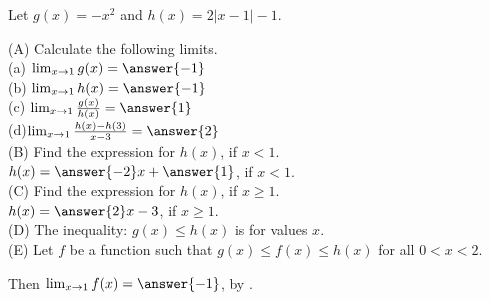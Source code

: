 \documentclass{ximera}
\author{Nela Lakos \and Kyle Parsons}
\begin{document}
\begin{exercise}

Let $g(x) = -x^2$ and $h(x) =  2\left|x-1\right|-1$.

(A) Calculate the following limits.\\[1em]
(a) $\lim_{x\to1}g(x) = \answer{-1}$\\

(b) $\lim_{x\to1}h(x)= \answer{-1}$\\

(c) $\lim_{x\to1}\frac{g(x)}{h(x)} = \answer{1}$\\ 

(d)$\lim_{x\to1}\frac{h(x)-h(3)}{x-3} = \answer{2}$\\[1em]


(B)  Find the expression for $h(x)$, if $x<1$.\\[1em]

$h(x)=\answer{-2}x +\answer{1}$,  if $x<1$. \\[1em]

(C)  Find the expression for $h(x)$, if $x\ge1$.\\[1em]

$h(x)=\answer{2}x -3$, if $x\ge1$.\\[1em]

(D) The inequality:   $g(x) \leq h(x)$    is  for  values $x$.\\[1em]
     
(E) Let $f$ be a function such that $g(x) \leq f(x) \leq h(x)$ for all $0 < x < 2$.

Then $\lim_{x\to1}f(x) = \answer{-1}$, by  .


\end{exercise}
\end{document}
